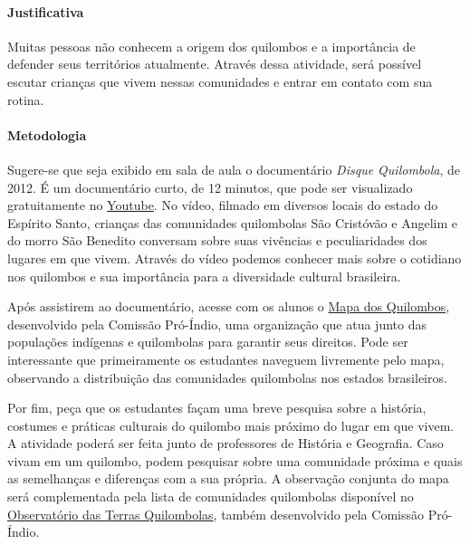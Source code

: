 \documentclass[11pt]{extarticle}
\begin{document}
\paragraph{Justificativa} Muitas pessoas não conhecem a origem dos quilombos e a importância de defender seus territórios atualmente. Através dessa atividade, será possível escutar crianças que vivem nessas comunidades e entrar em contato com sua rotina. 

\paragraph{Metodologia} Sugere-se que seja exibido em sala de aula o documentário \textit{Disque Quilombola}, de 2012. É um documentário curto, de 12 minutos, que pode ser visualizado gratuitamente no \href{https://youtu.be/GStv-f_bcfU}{Youtube}. No vídeo, filmado em diversos locais do estado do Espírito Santo, crianças das comunidades quilombolas São Cristóvão e Angelim e do morro São Benedito conversam sobre suas vivências e peculiaridades dos lugares em que vivem. Através do vídeo podemos conhecer mais sobre o cotidiano nos quilombos e sua importância para a diversidade cultural brasileira. 


Após assistirem ao documentário, acesse com os alunos o \href{https://cpisp.org.br/mapa-dos-quilombos-geografia-da-resistencia/}{Mapa dos Quilombos}, desenvolvido pela Comissão Pró-Índio, uma organização que atua junto das populações indígenas e quilombolas para garantir seus direitos. Pode ser interessante que primeiramente os estudantes naveguem livremente pelo mapa, observando a distribuição das comunidades quilombolas nos estados brasileiros.


Por fim, peça que os estudantes façam uma breve pesquisa sobre a história, costumes e práticas culturais do quilombo mais próximo do lugar em que vivem. A atividade poderá ser feita junto de professores de História e Geografia. Caso vivam em um quilombo, podem pesquisar sobre uma comunidade próxima e quais as semelhanças e diferenças com a sua própria. A observação conjunta do mapa será complementada pela lista de comunidades quilombolas disponível no \href{https://cpisp.org.br/direitosquilombolas/observatorio-terras-quilombolas/}{Observatório das Terras Quilombolas}, também desenvolvido pela Comissão Pró-Índio. 
\end{document}
